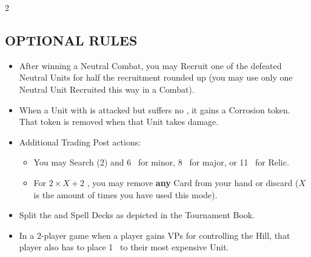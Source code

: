 \begin{multicols}{2}
\subsection*{\MakeUppercase{Optional Rules}}
\begin{itemize}
  \item After winning a Neutral Combat, you may Recruit one of the defeated Neutral Units for half the recruitment  rounded up (you may use only one Neutral Unit Recruited this way in a Combat).  %
  \item When a Unit with  is attacked but suffers no , it gains a Corrosion token. That token is removed when that Unit takes damage.
  \item Additional Trading Post actions:
  \begin{itemize}
    \item You may Search (2)  and  6~ for minor, 8~ for major, or 11~ for Relic.
    \item For $2×X+2$ , you may remove \textbf{any} Card from your hand or discard ($X$is the amount of times you have used this mode).
  \end{itemize}
  \item Split the  and Spell Decks as depicted in the Tournament Book.
  \item In a 2-player game when a player gains VPs for controlling the Hill, that player also has to place 1~ to their most expensive Unit.
\end{itemize}

\end{multicols}

